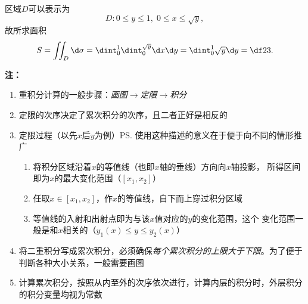 \begin{center}
\end{center}

区域$D$可以表示为
$$D:0\leq y\leq 1,\;0\leq x\leq\sqrt y,$$
故所求面积
$$S=\iint_D\d\sigma=\dint_0^1\dint_0^{\sqrt y}\d x\d y
=\dint_0^1\sqrt y\d y=\df23.$$
\fin

{\bf 注：}%
\begin{enumerate}[(1)]
  \setlength{\itemindent}{1cm}
  \item 重积分计算的一般步骤：{\it 画图$\to$定限$\to$积分}
  \item 定限的次序决定了累次积分的次序，且二者正好是相反的
  \item 定限过程（以先$x$后$y$为例）\ps{使用这种描述的意义在于便于向不同的情形推广}
  \begin{enumerate}[Step-1:]
    \setlength{\itemindent}{1cm}
    \item 将积分区域沿着$x$的等值线（也即$x$轴的垂线）方向向$x$轴投影，
    所得区间即为$x$的最大变化范围（$[x_1,x_2]$）
    \item 任取$x\in[x_1,x_2]$，作$x$的等值线，自下而上穿过积分区域
    \item 等值线的入射和出射点即为与该$x$值对应的$y$的变化范围，这个
    变化范围一般是和$x$相关的（$y_1(x)\leq y\leq y_2(x)$）
  \end{enumerate}
  \item 将二重积分写成累次积分，必须确保{\it 每个累次积分的上限大于下限}。为了便于
  判断各种大小关系，一般需要画图
  \item 计算累次积分，按照从内至外的次序依次进行，计算内层的积分时，外层积分
  的积分变量均视为常数
\end{enumerate}

